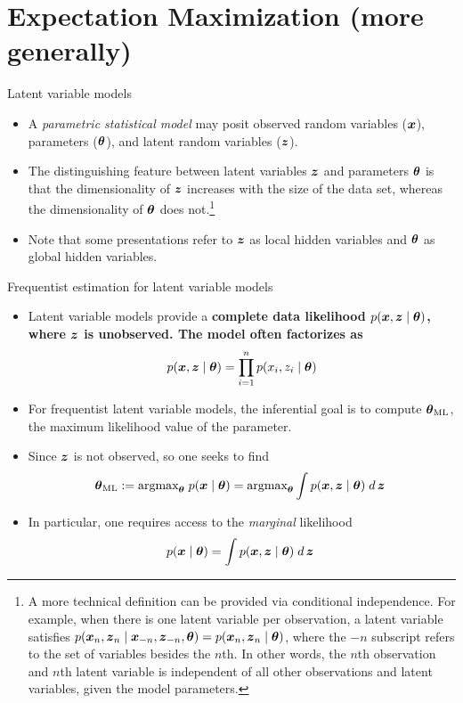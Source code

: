 \documentclass[10pt]{beamer}
\begin{document}
\section{Expectation Maximization (more generally)}

\begin{frame}{Latent variable models}

\begin{itemize}
\item A \textit{parametric statistical model} may posit observed random variables (${\boldsymbol x}$), parameters (${\boldsymbol \theta}$), and latent random variables (${\boldsymbol z}$).   
\item The distinguishing feature between latent variables ${\boldsymbol z}$ and parameters ${\boldsymbol \theta}$ is that the dimensionality of ${\boldsymbol z}$ increases with the size of the data set, whereas the dimensionality of ${\boldsymbol \theta}$ does not.\footnote{A more technical definition can be provided via conditional independence.  For example, when there is one latent variable per observation, a latent variable satisfies $p({\boldsymbol x}_n,{\boldsymbol z}_n \; | \; {\boldsymbol x}_{-n}, {\boldsymbol z}_{-n}, {\boldsymbol \theta}) = p({\boldsymbol x}_n,{\boldsymbol z}_n \; | \; {\boldsymbol \theta})$, where the $-n$ subscript refers to the set of variables besides the $n$th. In other words, the $n$th observation and $n$th latent variable is independent of all other observations and latent variables, given the model parameters.}  
\item 
 Note that some presentations refer to ${\boldsymbol z}$ as local hidden variables and ${\boldsymbol \theta}$ as global hidden variables.
\end{itemize}

\end{frame}

\begin{frame}{Frequentist estimation for latent variable models}
\footnotesize
\begin{itemize}
\item Latent variable models provide a \bf{complete data likelihood}  $p ({\boldsymbol x}, {\boldsymbol z} \; | \; {\boldsymbol \theta})$, where ${\boldsymbol z}$ is unobserved. The model often factorizes as
\[   p ({\boldsymbol x},  {\boldsymbol z} \; | \; {\boldsymbol \theta}) = \displaystyle\prod_{i=1}^n  p (x_i, z_i \; | \; {\boldsymbol \theta}) \]
\item For frequentist latent variable models, the inferential goal is to compute ${\boldsymbol \theta}_{\text{ML}}$, the maximum likelihood value of the parameter.  
\item Since ${\boldsymbol z}$ is not observed, so one seeks to find 
\begin{equation}
{\boldsymbol \theta}_{\text{ML}}:=  \text{argmax}_{{\boldsymbol \theta}} \; p ({\boldsymbol x} \; | \; {\boldsymbol \theta}) = \text{argmax}_{{\boldsymbol \theta}} \displaystyle\int p({\boldsymbol x},{\boldsymbol z} \; | \; {\boldsymbol \theta}) \; d \,{{\boldsymbol z}} \; 
\label{ml_latent_vars}
\end{equation}
\item In particular, one requires access to the \textit{marginal} likelihood
\begin{equation}
p({\boldsymbol x} \; | \; {\boldsymbol \theta}) = \displaystyle\int p({\boldsymbol x},{\boldsymbol z} \; | \; {\boldsymbol \theta}) \; d \,{{\boldsymbol z}} \; 
\label{marginal_likelihood}
\end{equation}
\end{itemize}
\end{frame}
\end{document}
